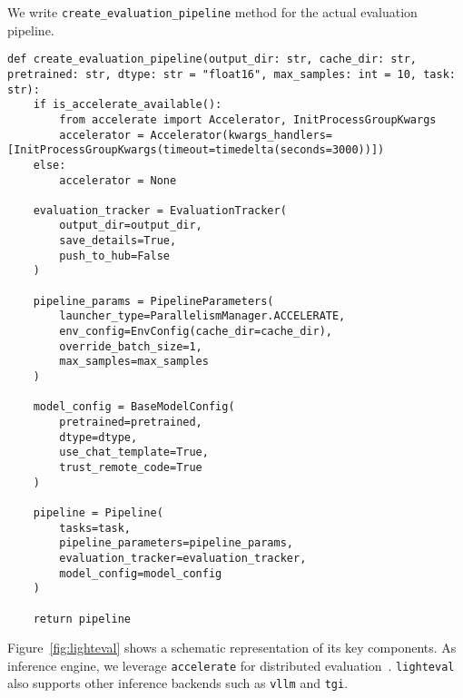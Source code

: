 We write \texttt{create\_evaluation\_pipeline} method for the actual evaluation pipeline.~
\begin{verbatim}
def create_evaluation_pipeline(output_dir: str, cache_dir: str, pretrained: str, dtype: str = "float16", max_samples: int = 10, task: str):
    if is_accelerate_available():
        from accelerate import Accelerator, InitProcessGroupKwargs
        accelerator = Accelerator(kwargs_handlers=[InitProcessGroupKwargs(timeout=timedelta(seconds=3000))])
    else:
        accelerator = None

    evaluation_tracker = EvaluationTracker(
        output_dir=output_dir,
        save_details=True,
        push_to_hub=False  
    )

    pipeline_params = PipelineParameters(
        launcher_type=ParallelismManager.ACCELERATE,
        env_config=EnvConfig(cache_dir=cache_dir),
        override_batch_size=1,
        max_samples=max_samples
    )

    model_config = BaseModelConfig(
        pretrained=pretrained,
        dtype=dtype,
        use_chat_template=True,
        trust_remote_code=True
    )

    pipeline = Pipeline(
        tasks=task,
        pipeline_parameters=pipeline_params,
        evaluation_tracker=evaluation_tracker,
        model_config=model_config
    )
    
    return pipeline
\end{verbatim}
Figure~\ref{fig:lighteval} shows a schematic representation of its key components. As inference engine, we leverage \texttt{accelerate} for distributed evaluation~. \texttt{lighteval} also supports other inference backends such as \texttt{vllm} and \texttt{tgi}.

